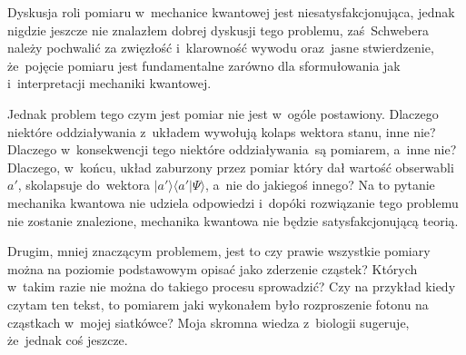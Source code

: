 \documentclass[a4paper,11pt]{article}
\begin{document}
\vspace{\spaceTwo}











\newpage


\vspace{0em}



\vspace{0em}


\noindent
{} Dyskusja roli pomiaru w~mechanice kwantowej jest
niesatysfakcjonująca, jednak nigdzie jeszcze nie znalazłem dobrej
dyskusji tego problemu, zaś~Schwebera należy pochwalić za zwięzłość
i~klarowność wywodu oraz~jasne stwierdzenie, że~pojęcie pomiaru jest
fundamentalne zarówno dla sformułowania jak i~interpretacji mechaniki
kwantowej.

Jednak problem tego czym jest pomiar nie jest w~ogóle postawiony.
Dlaczego niektóre oddziaływania z~układem wywołują kolaps wektora
stanu, inne nie? Dlaczego w~konsekwencji tego niektóre oddziaływania~są
pomiarem, a~inne nie? Dlaczego, w~końcu, układ zaburzony przez pomiar
który dał wartość obserwabli $a'$, skolapsuje do~wektora
$| a' \rangle \langle a' | \Psi \rangle$, a~nie do jakiegoś innego? Na to pytanie mechanika
kwantowa nie udziela odpowiedzi i~dopóki rozwiązanie tego problemu nie
zostanie znalezione, mechanika kwantowa nie będzie satysfakcjonującą teorią.

Drugim, mniej znaczącym problemem, jest to czy prawie wszystkie
pomiary można na poziomie podstawowym opisać jako zderzenie cząstek?
Których w~takim razie nie można do takiego procesu sprowadzić? Czy na
przykład kiedy czytam ten tekst, to pomiarem jaki wykonałem było
rozproszenie fotonu na cząstkach w~mojej siatkówce? Moja skromna
wiedza z~biologii sugeruje, że~jednak coś jeszcze.

\vspace{\spaceFour}
\end{document}
